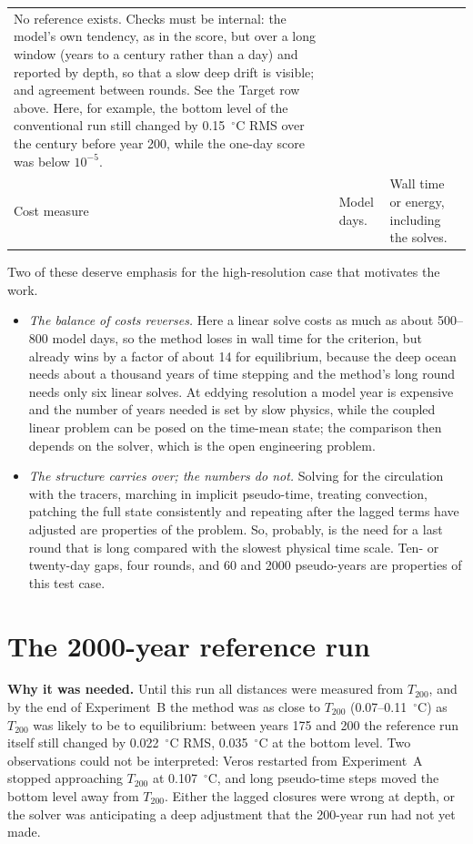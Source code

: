 \documentclass{article}
\begin{document}
{\begin{longtable}{>{\raggedright\arraybackslash}p{}|p{}|p{}}
No reference exists. Checks must be internal: the model's own tendency, as in the score, but over a long window (years to a century rather than a day) and reported by depth, so that a slow deep drift is visible; and agreement between rounds. See the Target row above. Here, for example, the bottom level of the conventional run still changed by 0.15~$^\circ$C RMS over the century before year 200, while the one-day score was below $10^{-5}$. \\[1ex]
Cost measure &
Model days. &
Wall time or energy, including the solves. \\
\end{longtable}
}

Two of these deserve emphasis for the high-resolution case that motivates the work.
\begin{itemize}
\item \emph{The balance of costs reverses.} Here a linear solve costs as much as about 500--800 model days, so the method loses in wall time for the criterion, but already wins by a factor of about 14 for equilibrium, because the deep ocean needs about a thousand years of time stepping and the method's long round needs only six linear solves. At eddying resolution a model year is expensive and the number of years needed is set by slow physics, while the coupled linear problem can be posed on the time-mean state; the comparison then depends on the solver, which is the open engineering problem.
\item \emph{The structure carries over; the numbers do not.} Solving for the circulation with the tracers, marching in implicit pseudo-time, treating convection, patching the full state consistently and repeating after the lagged terms have adjusted are properties of the problem. So, probably, is the need for a last round that is long compared with the slowest physical time scale. Ten- or twenty-day gaps, four rounds, and 60 and 2000 pseudo-years are properties of this test case.
\end{itemize}

\section{The 2000-year reference run}\label{sec:2000}

\textbf{Why it was needed.} Until this run all distances were measured from $T_{200}$, and by the end of Experiment~B the method was as close to $T_{200}$ (0.07--0.11~$^\circ$C) as $T_{200}$ was likely to be to equilibrium: between years 175 and 200 the reference run itself still changed by 0.022~$^\circ$C RMS, 0.035~$^\circ$C at the bottom level. Two observations could not be interpreted: Veros restarted from Experiment~A stopped approaching $T_{200}$ at 0.107~$^\circ$C, and long pseudo-time steps moved the bottom level away from $T_{200}$. Either the lagged closures were wrong at depth, or the solver was anticipating a deep adjustment that the 200-year run had not yet made.
\end{document}
